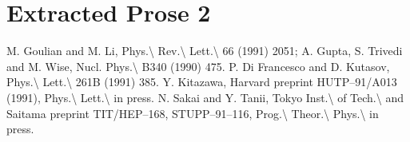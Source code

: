 \documentclass[11pt]{article}
\begin{document}
\section{Extracted Prose 2}
M. Goulian and M. Li, Phys.\textbackslash{} Rev.\textbackslash{} Lett.\textbackslash{} 66 (1991) 2051; A. Gupta, S. Trivedi and M. Wise, Nucl. Phys.\textbackslash{} B340 (1990) 475. P. Di Francesco and D. Kutasov, Phys.\textbackslash{} Lett.\textbackslash{} 261B (1991) 385. Y. Kitazawa, Harvard preprint HUTP--91/A013 (1991), Phys.\textbackslash{} Lett.\textbackslash{} in press. N. Sakai and Y. Tanii, Tokyo Inst.\textbackslash{} of Tech.\textbackslash{} and Saitama preprint TIT/HEP--168, STUPP--91--116, Prog.\textbackslash{} Theor.\textbackslash{} Phys.\textbackslash{} in press.
\end{document}
